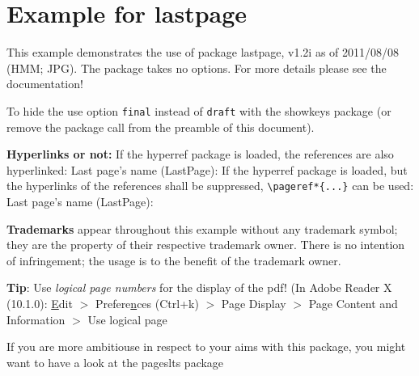 \documentclass[british]{article}
\begin{document}

\section*{Example for lastpage}

This example demonstrates the use of package\newline
\textsf{lastpage}, v1.2i as of 2011/08/08 (HMM; JPG).\newline
The package takes no options.\newline
For more details please see the documentation!\newline

\noindent \label{keys} To hide the \pageref{keys}{\qquad } use option
\texttt{final} instead of \texttt{draft} with the \textsf{showkeys}
package (or remove the package call from the preamble of
this document).\newline

\textbf{Hyperlinks or not:} If the \textsf{hyperref} package is loaded,
the references are also hyperlinked:\newline
\smallskip
Last page's name (LastPage): \pageref{LastPage}\newline
\noindent If the \textsf{hyperref} package is loaded, but the hyperlinks
of the references shall be suppressed, \verb|\pageref*{...}|
can be used:\newline
\smallskip
Last page's name (LastPage): \pageref*{LastPage}\newline

\textbf{Trademarks} appear throughout this example without any
trademark symbol; they are the property of their respective
trademark owner. There is no intention of infringement; the
usage is to the benefit of the trademark owner.\newline

\textbf{Tip}: Use \textit{logical page numbers} for
the display of the pdf!\newline
(In Adobe Reader X (10.1.0): \underline{E}dit $>$
Prefere\underline{n}ces (Ctrl+k) $>$ Page Display $>$
Page Content and Information $>$ Use logical page
\newline

If you are more ambitiouse in respect to your aims with this package,
you might want to have a look at the \textsf{pageslts} package\newline
\makeatletter
\makeatother
\end{document}
